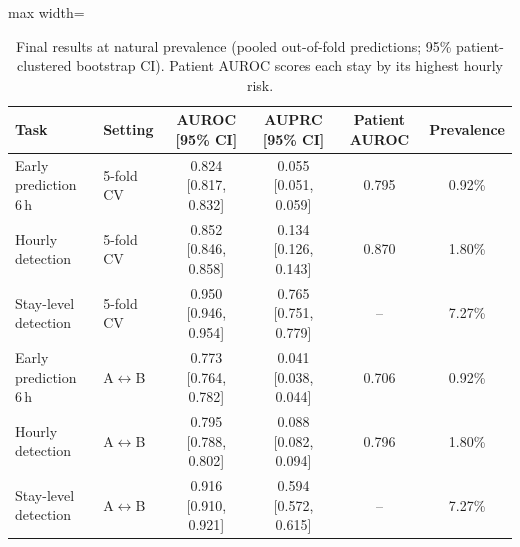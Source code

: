 \begin{table}[!t]
\centering\footnotesize
\caption{Final results at natural prevalence (pooled out-of-fold predictions; 95\% patient-clustered bootstrap CI). Patient AUROC scores each stay by its highest hourly risk.}
\label{tab:main}
\begin{adjustbox}{max width=\linewidth}
\begin{tabular}{llcccc}
\toprule
Task & Setting & AUROC [95\% CI] & AUPRC [95\% CI] & Patient AUROC & Prevalence \\
\midrule
Early prediction 6\,h & 5-fold CV & 0.824 [0.817, 0.832] & 0.055 [0.051, 0.059] & 0.795 & 0.92\% \\
Hourly detection & 5-fold CV & 0.852 [0.846, 0.858] & 0.134 [0.126, 0.143] & 0.870 & 1.80\% \\
Stay-level detection & 5-fold CV & 0.950 [0.946, 0.954] & 0.765 [0.751, 0.779] & -- & 7.27\% \\
\midrule
Early prediction 6\,h & A$\leftrightarrow$B & 0.773 [0.764, 0.782] & 0.041 [0.038, 0.044] & 0.706 & 0.92\% \\
Hourly detection & A$\leftrightarrow$B & 0.795 [0.788, 0.802] & 0.088 [0.082, 0.094] & 0.796 & 1.80\% \\
Stay-level detection & A$\leftrightarrow$B & 0.916 [0.910, 0.921] & 0.594 [0.572, 0.615] & -- & 7.27\% \\
\bottomrule
\end{tabular}
\end{adjustbox}
\end{table}
